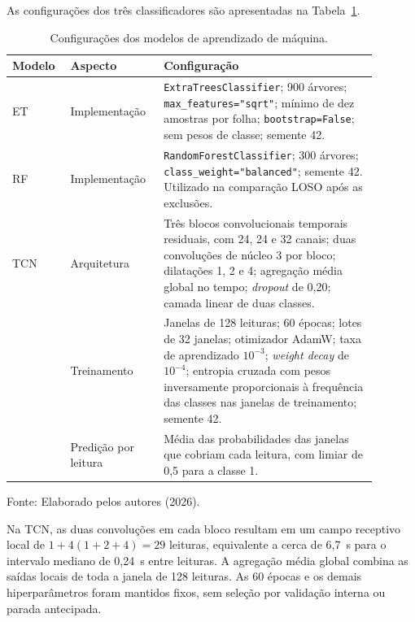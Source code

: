 As configurações dos três classificadores são apresentadas na
Tabela~\ref{tab:configuracao_modelos}.

\begin{table}[H]
    \centering
    \small
    \caption{Configurações dos modelos de aprendizado de máquina.}
    \label{tab:configuracao_modelos}
    \begin{tabular}{p{0.13\linewidth}p{0.22\linewidth}p{0.54\linewidth}}
        \hline
        \textbf{Modelo} & \textbf{Aspecto} & \textbf{Configuração} \\
        \hline
        ET & Implementação &
        \texttt{ExtraTreesClassifier}; 900 árvores;
        \texttt{max\_features="sqrt"}; mínimo de dez amostras por folha;
        \texttt{bootstrap=False}; sem pesos de classe; semente 42. \\
        \hline
        RF & Implementação &
        \texttt{RandomForestClassifier}; 300 árvores;
        \texttt{class\_weight="balanced"}; semente 42. Utilizado na
        comparação LOSO após as exclusões. \\
        \hline
        TCN & Arquitetura &
        Três blocos convolucionais temporais residuais, com 24, 24 e
        32 canais; duas convoluções de núcleo 3 por bloco; dilatações
        1, 2 e 4; agregação média global no tempo; \emph{dropout} de
        0,20; camada linear de duas classes. \\
        & Treinamento &
        Janelas de 128 leituras; 60 épocas; lotes de 32 janelas;
        otimizador AdamW; taxa de aprendizado $10^{-3}$;
        \emph{weight decay} de $10^{-4}$; entropia cruzada com pesos
        inversamente proporcionais à frequência das classes nas
        janelas de treinamento; semente 42. \\
        & Predição por leitura &
        Média das probabilidades das janelas que cobriam cada leitura,
        com limiar de 0,5 para a classe 1. \\
        \hline
    \end{tabular}

    \vspace{0.1cm}
    {\footnotesize Fonte: Elaborado pelos autores (2026).}
\end{table}

Na TCN, as duas convoluções em cada bloco resultam em um campo
receptivo local de $1+4(1+2+4)=29$ leituras, equivalente a cerca de
6,7~s para o intervalo mediano de 0,24~s entre leituras. A agregação
média global combina as saídas locais de toda a janela de 128 leituras.
As 60 épocas e os demais hiperparâmetros foram mantidos fixos, sem
seleção por validação interna ou parada antecipada.


